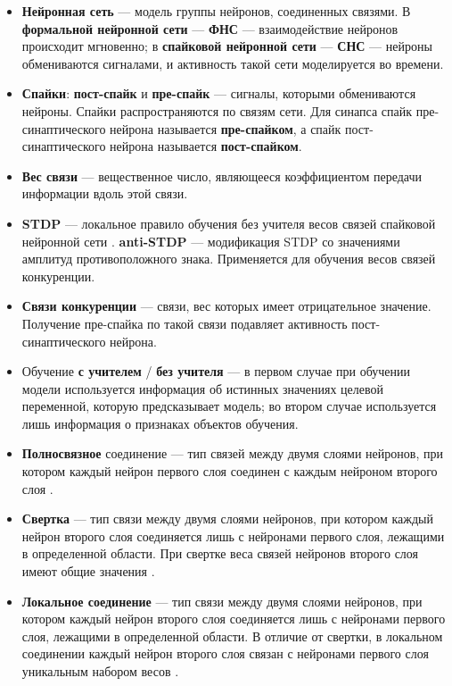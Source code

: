 \documentclass[a4paper]{article}
\begin{document}
\begin{itemize}
 \item \textbf{Нейронная сеть} --- модель группы нейронов, соединенных связями. В \textbf{формальной нейронной сети} --- \textbf{ФНС} --- взаимодействие нейронов происходит мгновенно; в \textbf{спайковой нейронной сети} --- \textbf{СНС} --- нейроны обмениваются сигналами, и активность такой сети моделируется во времени.
 \item \textbf{Спайки}: \textbf{пост-спайк} и \textbf{пре-спайк} --- сигналы, которыми обмениваются нейроны. Спайки распространяются по связям сети. Для синапса спайк пре-синаптического нейрона называется \textbf{пре-спайком}, а спайк пост-синаптического нейрона называется \textbf{пост-спайком}.
 \item \textbf{Вес связи} --- вещественное число, являющееся коэффициентом передачи информации вдоль этой связи. 
 \item \textbf{STDP} --- локальное правило обучения без учителя весов связей спайковой нейронной сети \cite{STDP}. \textbf{anti-STDP} --- модификация STDP со значениями амплитуд противоположного знака. Применяется для обучения весов связей конкуренции.
 \item \textbf{Связи конкуренции} --- связи, вес которых имеет отрицательное значение. Получение пре-спайка по такой связи подавляет активность пост-синаптического нейрона.
 \item Обучение \textbf{с учителем} / \textbf{без учителя} --- в первом случае при обучении модели используется информация об истинных значениях целевой переменной, которую предсказывает модель; во втором случае используется лишь информация о признаках объектов обучения.
 \item \textbf{Полносвязное} соединение --- тип связей между двумя слоями нейронов, при котором каждый нейрон первого слоя соединен с каждым нейроном второго слоя \cite{Khan_2020}.
 \item \textbf{Свертка} --- тип связи между двумя слоями нейронов, при котором каждый нейрон второго слоя соединяется лишь с нейронами первого слоя, лежащими в определенной области. При свертке веса связей нейронов второго слоя имеют общие значения \cite{Khan_2020}.
 \item \textbf{Локальное соединение} --- тип связи между двумя слоями нейронов, при котором каждый нейрон второго слоя соединяется лишь с нейронами первого слоя, лежащими в определенной области. В отличие от свертки, в локальном соединении каждый нейрон второго слоя связан с нейронами первого слоя уникальным набором весов \cite{Khan_2020}.
\end{itemize}
\end{document}
